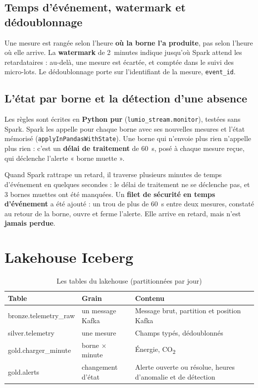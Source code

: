 \documentclass[11pt, a4paper, oneside, headings=normal, numbers=noenddot, DIV=12]{scrartcl}
\begin{document}
\subsection{Temps d'événement, watermark et dédoublonnage}
Une mesure est rangée selon l'heure \textbf{où la borne l'a produite}, pas selon l'heure où elle arrive. La \textbf{watermark} de 2~minutes
indique jusqu'où Spark attend les retardataires : au-delà, une mesure est écartée, et comptée dans le suivi des micro-lots. Le dédoublonnage
porte sur l'identifiant de la mesure, \texttt{event\_id}.

\subsection{L'état par borne et la détection d'une absence}
Les règles sont écrites en \textbf{Python pur} (\texttt{lumio\_stream.monitor}), testées sans Spark. Spark les appelle pour chaque borne avec ses
nouvelles mesures et l'état mémorisé (\texttt{applyInPandasWithState}). Une borne qui n'envoie plus rien n'appelle plus rien : c'est un
\textbf{délai de traitement} de 60~s, posé à chaque mesure reçue, qui déclenche l'alerte « borne muette ».

\begin{warnbox}
Quand Spark rattrape un retard, il traverse plusieurs minutes de temps d'événement en quelques secondes : le délai de traitement ne se
déclenche pas, et 3 bornes muettes ont été manquées. Un \textbf{filet de sécurité en temps d'événement} a été ajouté : un trou de plus de 60~s
entre deux mesures, constaté au retour de la borne, ouvre et ferme l'alerte. Elle arrive en retard, mais n'est \textbf{jamais perdue}.
\end{warnbox}

\section{Lakehouse Iceberg}

\begin{table}[H]
\centering\small
\begin{tabularx}{\linewidth}{@{}L{3.6cm} L{3.2cm} Y@{}}
\toprule
\textbf{Table} & \textbf{Grain} & \textbf{Contenu} \\
\midrule
bronze.telemetry\_raw & un message Kafka & Message brut, partition et position Kafka \\
silver.telemetry & une mesure & Champs typés, dédoublonnés \\
gold.charger\_minute & borne × minute & Énergie, CO\textsubscript{2} \\
gold.alerts & changement d'état & Alerte ouverte ou résolue, heures d'anomalie et de détection \\
\bottomrule
\end{tabularx}
\caption{Les tables du lakehouse (partitionnées par jour)}
\end{table}
\end{document}
